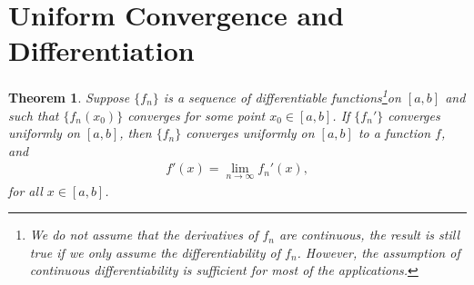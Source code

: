 \documentclass[10pt]{book}
\newtheorem{theorem}{Theorem}[chapter]
\theoremstyle{definition}
\numberwithin{equation}{chapter}
\begin{document}
\medskip



\section{Uniform Convergence and Differentiation}

\begin{theorem}\label{th_610}
Suppose $\{f_n\}$ is a sequence of differentiable functions\footnote{We do not assume that the derivatives of $f_n$ are continuous, the result is still true if we only assume the differentiability of $f_n$. However, the assumption of continuous differentiability is sufficient for most of the applications.}on $[a,b]$ and such that $\{f_n(x_0)\}$ converges for some point $x_0 \in [a,b]$. If $\{f_n'\}$ converges uniformly on $[a,b]$, then $\{f_n\}$ converges uniformly on $[a,b]$ to a function $f$, and 
\begin{align*}
    f'(x) = \lim_{n\to\infty} f_n'(x),
\end{align*}
for all $x \in [a,b]$.
\end{theorem}
\end{document}
